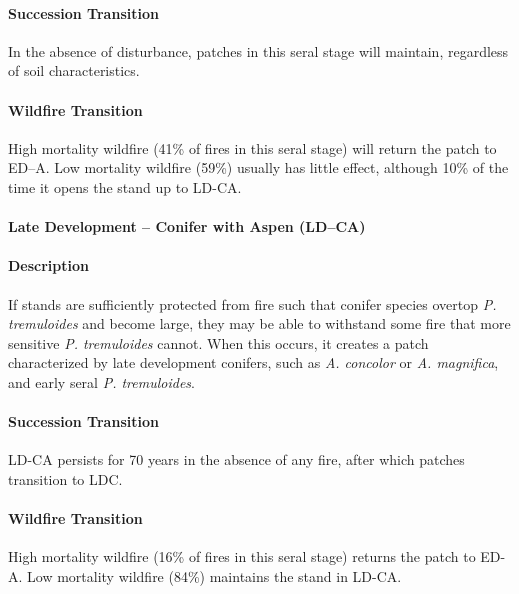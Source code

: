 \paragraph{Succession Transition} In the absence of disturbance, patches in this seral stage will maintain, regardless of soil characteristics.

\paragraph{Wildfire Transition} High mortality wildfire (41\% of fires in this seral stage) will return the patch to ED–A. Low mortality wildfire (59\%) usually has little effect, although 10\% of the time it opens the stand up to LD-CA.

\noindent\hrulefill


\paragraph{Late Development – Conifer with Aspen (LD–CA)}

\paragraph{Description} If stands are sufficiently protected from fire such that conifer species overtop \emph{P. tremuloides} and become large, they may be able to withstand some fire that more sensitive \emph{P. tremuloides} cannot. When this occurs, it creates a patch characterized by late development conifers, such as \emph{A. concolor} or \emph{A. magnifica}, and early seral \emph{P. tremuloides}. 

\paragraph{Succession Transition} LD-CA persists for 70 years in the absence of any fire, after which patches transition to LDC. 

\paragraph{Wildfire Transition} High mortality wildfire (16\% of fires in this seral stage) returns the patch to ED-A. Low mortality wildfire (84\%) maintains the stand in LD-CA.

\noindent\hrulefill


\newpage


